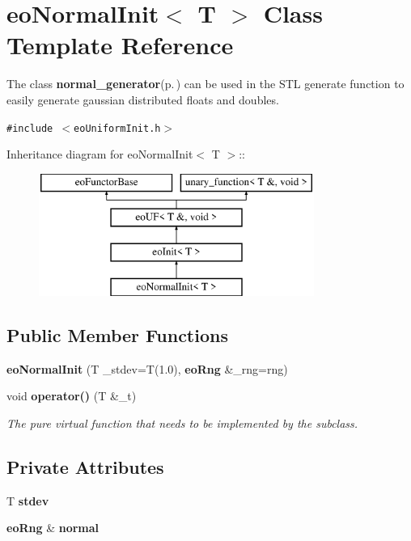 \section{eo\-Normal\-Init$<$ T $>$ Class Template Reference}
\label{classeo_normal_init}
The class {\bf normal\_\-generator}{\rm (p.\,\pageref{classnormal__generator})} can be used in the STL generate function to easily generate gaussian distributed floats and doubles.  


{\tt \#include $<$eo\-Uniform\-Init.h$>$}

Inheritance diagram for eo\-Normal\-Init$<$ T $>$::\begin{figure}[H]
\begin{center}
\leavevmode
\includegraphics[height=4cm]{classeo_normal_init}
\end{center}
\end{figure}
\subsection*{Public Member Functions}
\begin{CompactItemize}
\item 
{\bf eo\-Normal\-Init} (T \_\-stdev=T(1.0), {\bf eo\-Rng} \&\_\-rng=rng)\label{classeo_normal_init_a0}

\item 
void {\bf operator()} (T \&\_\-t)\label{classeo_normal_init_a1}

\begin{CompactList}\small\item\em The pure virtual function that needs to be implemented by the subclass. \item\end{CompactList}\end{CompactItemize}
\subsection*{Private Attributes}
\begin{CompactItemize}
\item 
T {\bf stdev}\label{classeo_normal_init_r0}

\item 
{\bf eo\-Rng} \& {\bf normal}\label{classeo_normal_init_r1}

\end{CompactItemize}


